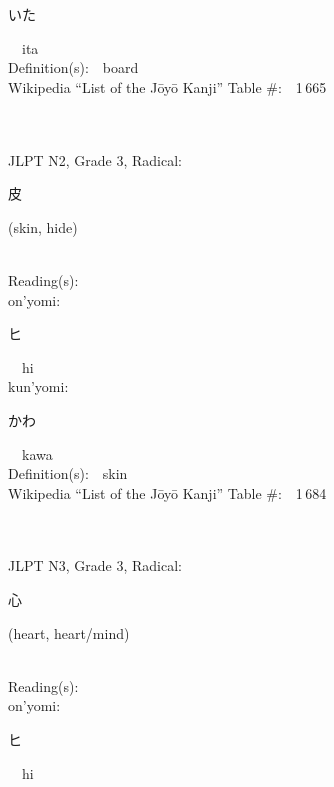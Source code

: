 \begin{multicols}{2}
{\hspace*{2em}}{\begin{CJK}{UTF8}{min} いた \end{CJK}}\ \ ita\ \ \\
Definition(s):\ \ board \\
Wikipedia ``List of the J\=oy\=o Kanji'' Table \#:\ \ 1\,665 \\
\ \ \\
{\fontsize{34pt}{40pt}  }\ \ \\  %
{JLPT N2, Grade 3, Radical:\ \ {\begin{CJK}{UTF8}{min} 皮 \end{CJK}} (skin, hide) } \\
Reading(s):\ \ \\
{\hspace*{1em}}on'yomi:\ \ \\
{\hspace*{2em}}{\begin{CJK}{UTF8}{min} ヒ \end{CJK}}\ \ hi\ \ \\
{\hspace*{1em}}kun'yomi:\ \ \\
{\hspace*{2em}}{\begin{CJK}{UTF8}{min} かわ \end{CJK}}\ \ kawa\ \ \\
Definition(s):\ \ skin \\
Wikipedia ``List of the J\=oy\=o Kanji'' Table \#:\ \ 1\,684 \\
\ \ \\
{\fontsize{34pt}{40pt}  }\ \ \\  %
{JLPT N3, Grade 3, Radical:\ \ {\begin{CJK}{UTF8}{min} 心 \end{CJK}} (heart, heart/mind) } \\
Reading(s):\ \ \\
{\hspace*{1em}}on'yomi:\ \ \\
{\hspace*{2em}}{\begin{CJK}{UTF8}{min} ヒ \end{CJK}}\ \ hi\ \ \\

\end{multicols}
